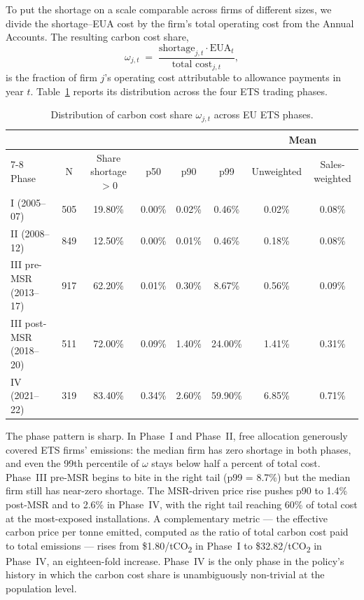 To put the shortage on a scale comparable across firms of different sizes, we divide the shortage--EUA cost by the firm's total operating cost from the Annual Accounts. The resulting carbon cost share,
\[
    \omega_{j,t} \;=\; \frac{\text{shortage}_{j,t} \cdot \text{EUA}_t}{\text{total cost}_{j,t}},
\]
is the fraction of firm $j$'s operating cost attributable to allowance payments in year $t$. Table~\ref{tab:firm_cost_share_by_phase} reports its distribution across the four ETS trading phases.

\begin{table}[H]
    \centering
    \caption{Distribution of carbon cost share $\omega_{j,t}$ across EU ETS phases.}
    \label{tab:firm_cost_share_by_phase}
    \footnotesize
    \begin{tabular}{lccccccc}
        \toprule
        & & & & & & \multicolumn{2}{c}{Mean} \\
        \cmidrule(lr){7-8}
        Phase & N & Share shortage $> 0$ & p50 & p90 & p99 & Unweighted & Sales-weighted \\
        \midrule
        I (2005--07)            & 505 & 19.80\% & 0.00\% & 0.02\% & 0.46\%  & 0.02\% & 0.08\% \\
        II (2008--12)           & 849 & 12.50\% & 0.00\% & 0.01\% & 0.46\%  & 0.18\% & 0.08\% \\
        III pre-MSR (2013--17)  & 917 & 62.20\% & 0.01\% & 0.30\% & 8.67\%  & 0.56\% & 0.09\% \\
        III post-MSR (2018--20) & 511 & 72.00\% & 0.09\% & 1.40\% & 24.00\% & 1.41\% & 0.31\% \\
        IV (2021--22)           & 319 & 83.40\% & 0.34\% & 2.60\% & 59.90\% & 6.85\% & 0.71\% \\
        \bottomrule
    \end{tabular}
\end{table}

The phase pattern is sharp. In Phase~I and Phase~II, free allocation generously covered ETS firms' emissions: the median firm has zero shortage in both phases, and even the 99th percentile of $\omega$ stays below half a percent of total cost. Phase~III pre-MSR begins to bite in the right tail (p99 = 8.7\%) but the median firm still has near-zero shortage. The MSR-driven price rise pushes p90 to 1.4\% post-MSR and to 2.6\% in Phase~IV, with the right tail reaching 60\% of total cost at the most-exposed installations. A complementary metric --- the effective carbon price per tonne emitted, computed as the ratio of total carbon cost paid to total emissions --- rises from \$1.80/tCO\textsubscript{2} in Phase~I to \$32.82/tCO\textsubscript{2} in Phase~IV, an eighteen-fold increase. Phase~IV is the only phase in the policy's history in which the carbon cost share is unambiguously non-trivial at the population level.

